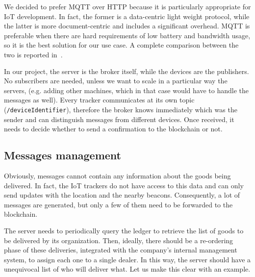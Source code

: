 We decided to prefer MQTT over HTTP because it is particularly appropriate for IoT development. In fact, the former is a data-centric light weight protocol, while the latter is more document-centric and includes a significant overhead. MQTT is preferable when there are hard requirements of low battery and bandwidth usage, so it is the best solution for our use case. A complete comparison between the two is reported in~\cite{httpVSmqtt}.

In our project, the server is the broker itself, while the devices are the publishers. No subscribers are needed, unless we want to scale in a particular way the servers, (e.g. adding other machines, which in that case would have to handle the messages as well). Every tracker communicates at its own topic (\texttt{/deviceIdentifier}), therefore the broker knows immediately which was the sender and can distinguish messages from different devices. Once received, it needs to decide whether to send a confirmation to the blockchain or not.

\subsection{Messages management}
Obviously, messages cannot contain any information about the goods being delivered. In fact, the IoT trackers do not have access to this data and can only send updates with the location and the nearby beacons. Consequently, a lot of messages are generated, but only a few of them need to be forwarded to the blockchain.

The server needs to periodically query the ledger to retrieve the list of goods to be delivered by its organization. Then, ideally, there should be a re-ordering phase of these deliveries, integrated with the company's internal management system, to assign each one to a single dealer. In this way, the server should have a unequivocal list of who will deliver what. Let us make this clear with an example.

